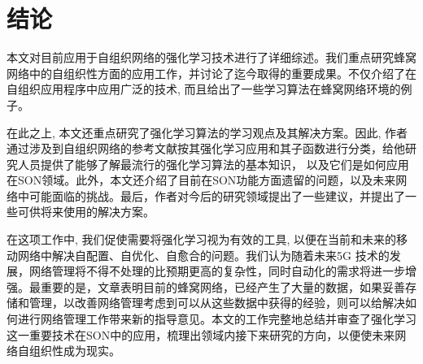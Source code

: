 \documentclass{IEEEtran}
\begin{document}
\section{结论}
\label{sec:Conclusion}

本文对目前应用于自组织网络的强化学习技术进行了详细综述。我们重点研究蜂窝网络中的自组织性方面的应用工作，并讨论了迄今取得的重要成果。不仅介绍了在自组织应用程序中应用广泛的技术, 而且给出了一些学习算法在蜂窝网络环境的例子。

在此之上, 本文还重点研究了强化学习算法的学习观点及其解决方案。因此, 作者通过涉及到自组织网络的参考文献按其强化学习应用和其子函数进行分类，给他研究人员提供了能够了解最流行的强化学习算法的基本知识， 以及它们是如何应用在SON领域。此外，本文还介绍了目前在SON功能方面遗留的问题，以及未来网络中可能面临的挑战。最后，作者对今后的研究领域提出了一些建议，并提出了一些可供将来使用的解决方案。

在这项工作中, 我们促使需要将强化学习视为有效的工具, 以便在当前和未来的移动网络中解决自配置、自优化、自愈合的问题。我们认为随着未来5G 技术的发展，网络管理将不得不处理的比预期更高的复杂性，同时自动化的需求将进一步增强。最重要的是，文章表明目前的蜂窝网络，已经产生了大量的数据，如果妥善存储和管理，以改善网络管理考虑到可以从这些数据中获得的经验，则可以给解决如何进行网络管理工作带来新的指导意见。本文的工作完整地总结并审查了强化学习这一重要技术在SON中的应用，梳理出领域内接下来研究的方向，以便使未来网络自组织性成为现实。




\end{document}

